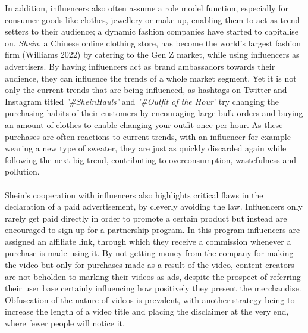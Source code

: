 \documentclass{article}
\begin{document}
	In addition, influencers also often assume a role model function, especially for consumer goods like clothes, jewellery or make up, enabling them to act as trend setters to their audience; a dynamic fashion companies have started to capitalise on. \textit{Shein}, a Chinese online clothing store, has become the world's largest fashion firm (Williams 2022) by catering to the Gen Z market, while using influencers as advertisers. By having influencers act as brand ambassadors towards their audience, they can influence the trends of a whole market segment. Yet it is not only the current trends that are being influenced, as hashtags on Twitter and Instagram titled \textit{'\#SheinHauls'} and \textit{'\#Outfit of the Hour'} try changing the purchasing habits of their customers by encouraging large bulk orders and buying an amount of clothes to enable changing your outfit once per hour. As these purchases are often reactions to current trends, with an influencer for example wearing a new type of sweater, they are just as quickly discarded again while following the next big trend, contributing to overconsumption, wastefulness and pollution. \\ \\

	Shein's cooperation with influencers also highlights critical flaws in the declaration of a paid advertisement, by cleverly avoiding the law. Influencers only rarely get paid directly in order to promote a certain product but instead are encouraged to sign up for a partnership program. In this program influencers are assigned an affiliate link, through which they receive a commission whenever a purchase is made using it. By not getting money from the company for making the video but only for purchases made as a result of the video, content creators are not beholden to marking their videos as ads, despite the prospect of referring their user base certainly influencing how positively they present the merchandise. Obfuscation of the nature of videos is prevalent, with another strategy being to increase the length of a video title and placing the disclaimer at the very end, where fewer people will notice it. \\ \\
\end{document}
